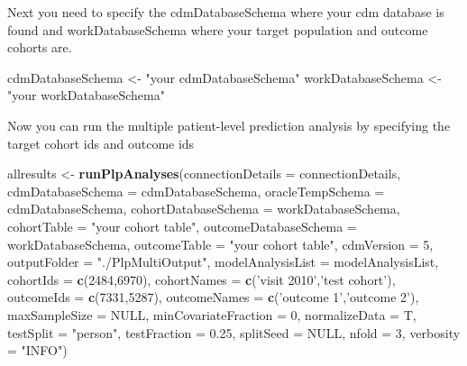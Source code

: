 \documentclass[]{article}
\newenvironment{Shaded}{\begin{snugshade}}{\end{snugshade}}
\newcommand{\KeywordTok}[1]{\textcolor[rgb]{0.13,0.29,0.53}{\textbf{#1}}}
\newcommand{\DataTypeTok}[1]{\textcolor[rgb]{0.13,0.29,0.53}{#1}}
\newcommand{\DecValTok}[1]{\textcolor[rgb]{0.00,0.00,0.81}{#1}}
\newcommand{\FloatTok}[1]{\textcolor[rgb]{0.00,0.00,0.81}{#1}}
\newcommand{\StringTok}[1]{\textcolor[rgb]{0.31,0.60,0.02}{#1}}
\newcommand{\OtherTok}[1]{\textcolor[rgb]{0.56,0.35,0.01}{#1}}
\newcommand{\NormalTok}[1]{#1}
\begin{document}
Next you need to specify the cdmDatabaseSchema where your cdm database
is found and workDatabaseSchema where your target population and outcome
cohorts are.

\begin{Shaded}
\begin{Highlighting}[]
\NormalTok{cdmDatabaseSchema <-}\StringTok{ "your cdmDatabaseSchema"}
\NormalTok{workDatabaseSchema <-}\StringTok{ "your workDatabaseSchema"}
\end{Highlighting}
\end{Shaded}

Now you can run the multiple patient-level prediction analysis by
specifying the target cohort ids and outcome ids

\begin{Shaded}
\begin{Highlighting}[]
\NormalTok{allresults <-}\StringTok{ }\KeywordTok{runPlpAnalyses}\NormalTok{(}\DataTypeTok{connectionDetails =}\NormalTok{ connectionDetails,}
                           \DataTypeTok{cdmDatabaseSchema =}\NormalTok{ cdmDatabaseSchema,}
                           \DataTypeTok{oracleTempSchema =}\NormalTok{ cdmDatabaseSchema,}
                           \DataTypeTok{cohortDatabaseSchema =}\NormalTok{ workDatabaseSchema,}
                           \DataTypeTok{cohortTable =} \StringTok{"your cohort table"}\NormalTok{,}
                           \DataTypeTok{outcomeDatabaseSchema =}\NormalTok{ workDatabaseSchema,}
                           \DataTypeTok{outcomeTable =} \StringTok{"your cohort table"}\NormalTok{,}
                           \DataTypeTok{cdmVersion =} \DecValTok{5}\NormalTok{,}
                           \DataTypeTok{outputFolder =} \StringTok{"./PlpMultiOutput"}\NormalTok{,}
                           \DataTypeTok{modelAnalysisList =}\NormalTok{ modelAnalysisList,}
                           \DataTypeTok{cohortIds =} \KeywordTok{c}\NormalTok{(}\DecValTok{2484}\NormalTok{,}\DecValTok{6970}\NormalTok{),}
                           \DataTypeTok{cohortNames =} \KeywordTok{c}\NormalTok{(}\StringTok{'visit 2010'}\NormalTok{,}\StringTok{'test cohort'}\NormalTok{),}
                           \DataTypeTok{outcomeIds =} \KeywordTok{c}\NormalTok{(}\DecValTok{7331}\NormalTok{,}\DecValTok{5287}\NormalTok{),}
                           \DataTypeTok{outcomeNames =}  \KeywordTok{c}\NormalTok{(}\StringTok{'outcome 1'}\NormalTok{,}\StringTok{'outcome 2'}\NormalTok{),}
                           \DataTypeTok{maxSampleSize =} \OtherTok{NULL}\NormalTok{,}
                           \DataTypeTok{minCovariateFraction =} \DecValTok{0}\NormalTok{,}
                           \DataTypeTok{normalizeData =}\NormalTok{ T,}
                           \DataTypeTok{testSplit =} \StringTok{"person"}\NormalTok{,}
                           \DataTypeTok{testFraction =} \FloatTok{0.25}\NormalTok{,}
                           \DataTypeTok{splitSeed =} \OtherTok{NULL}\NormalTok{,}
                           \DataTypeTok{nfold =} \DecValTok{3}\NormalTok{,}
                           \DataTypeTok{verbosity =} \StringTok{"INFO"}\NormalTok{)}
\end{Highlighting}
\end{Shaded}
\end{document}
